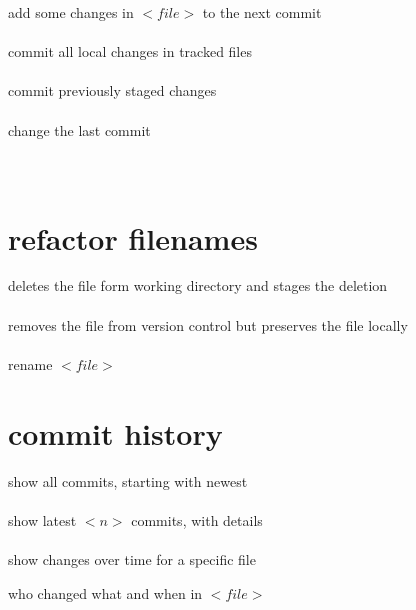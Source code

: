 \documentclass[12pt,landscape]{article}
\begin{document}
\begin{multicols*}{3}
add some changes in \(<file>\) to the next commit \\
 \\

commit all local changes in tracked files \\
 \\

commit previously staged changes \\
 \\

change the last commit \\
 \\
 \\

\section{refactor filenames}

deletes the file form working directory and stages the deletion \\
 \\

removes the file from version control but preserves the file locally \\
 \\

\textcolor{solarized_red}{rename \(<file>\)} \\

\section{commit history}

show all commits, starting with newest \\
 \\

show latest \(<n>\) commits, with details \\
 \\

show changes over time for a specific file\\

who changed what and when in \(<file>\) \\
 \\


\end{multicols*}
\end{document}

